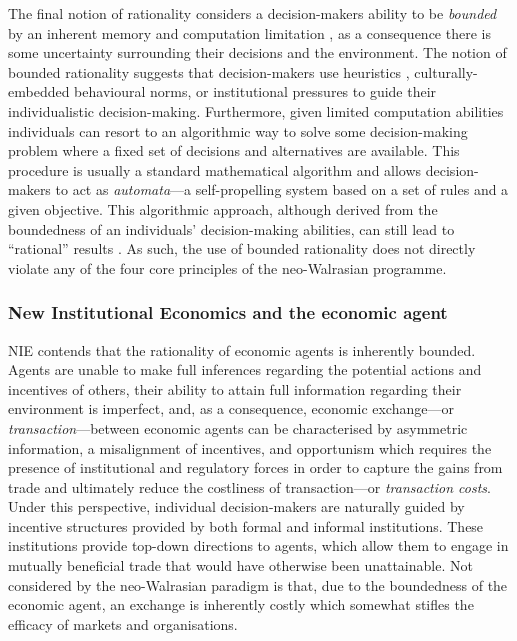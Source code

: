 The final notion of rationality considers a decision-makers ability to be \emph{bounded} by an inherent memory and computation limitation \citep{Simon1957, Simon1990, Simon1991b}, as a consequence there is some uncertainty surrounding their decisions and the environment. The notion of bounded rationality suggests that decision-makers use heuristics \citep{GigerenzerGaissmaier2011}, culturally-embedded behavioural norms, or institutional pressures \citep{Hodgson1997} to guide their individualistic decision-making. Furthermore, given limited computation abilities individuals can resort to an algorithmic way to solve some decision-making problem where a fixed set of decisions and alternatives are available. This procedure is usually a standard mathematical algorithm and allows decision-makers to act as \emph{automata}---a self-propelling system based on a set of rules and a given objective. This algorithmic approach, although derived from the boundedness of an individuals' decision-making abilities, can still lead to ``rational'' results \citep{Rubinstein1998}. As such, the use of bounded rationality does not directly violate any of the four core principles of the neo-Walrasian programme.

\subsubsection{New Institutional Economics and the economic agent}

NIE contends that the rationality of economic agents is inherently bounded. Agents are unable to make full inferences regarding the potential actions and incentives of others, their ability to attain full information regarding their environment is imperfect, and, as a consequence, economic exchange---or \emph{transaction}---between economic agents can be characterised by asymmetric information, a misalignment of incentives, and opportunism which requires the presence of institutional and regulatory forces in order to capture the gains from trade and ultimately reduce the costliness of transaction---or \emph{transaction costs}. Under this perspective, individual decision-makers are naturally guided by incentive structures provided by both formal and informal institutions. These institutions provide top-down directions to agents, which allow them to engage in mutually beneficial trade that would have otherwise been unattainable. Not considered by the neo-Walrasian paradigm is that, due to the boundedness of the economic agent, an exchange is inherently costly which somewhat stifles the efficacy of markets and organisations.


